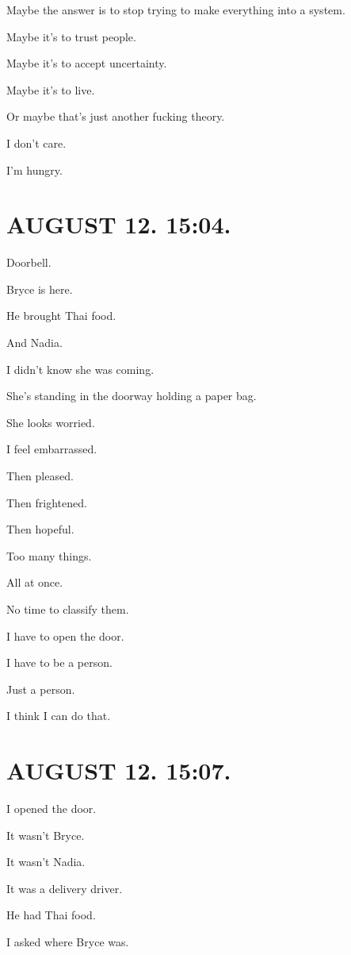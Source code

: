 \documentclass[11pt,oneside]{book}
\begin{document}
Maybe the answer is to stop trying to make everything into a system.

Maybe it's to trust people.

Maybe it's to accept uncertainty.

Maybe it's to live.

Or maybe that's just another fucking theory.

I don't care.

I'm hungry.

\section*{AUGUST 12. 15:04.}

Doorbell.

Bryce is here.

He brought Thai food.

And Nadia.

I didn't know she was coming.

She's standing in the doorway holding a paper bag.

She looks worried.

I feel embarrassed.

Then pleased.

Then frightened.

Then hopeful.

Too many things.

All at once.

No time to classify them.

I have to open the door.

I have to be a person.

Just a person.

I think I can do that.

\section*{AUGUST 12. 15:07.}

I opened the door.

It wasn't Bryce.

It wasn't Nadia.

It was a delivery driver.

He had Thai food.

I asked where Bryce was.
\end{document}
